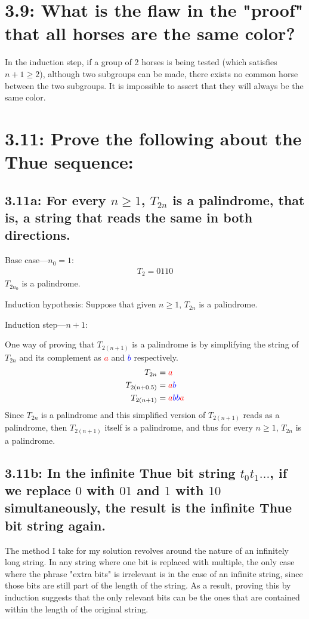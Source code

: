 \documentclass{article}
\begin{document}
\section*{3.9: What is the flaw in the "proof" that all horses are the same color?}
In the induction step, if a group of 2 horses is being tested (which satisfies $n+1\geq2$), although two subgroups can be made, there exists no common horse between the two subgroups. It is impossible to assert that they will always be the same color.
\section*{3.11: Prove the following about the Thue sequence:}
\subsection*{3.11a: For every $n\geq1$, $T_{2n}$ is a palindrome, that is, a string that reads the same in both directions.}
Base case---$n_0=1$:
\begin{align*}
  T_2=0110
\end{align*}
$T_{2n_0}$ is a palindrome.

Induction hypothesis: Suppose that given $n\geq1$, $T_{2n}$ is a palindrome.

Induction step---$n+1$:

One way of proving that $T_{2(n+1)}$ is a palindrome is by simplifying the string of $T_{2n}$ and its complement as \textcolor{red}{$a$} and \textcolor{blue}{$b$} respectively.
\begin{align*}
  T_{2n}&=\textcolor{red}{a}\\
  T_{2(n+0.5)}&=\textcolor{red}{a}\textcolor{blue}{b}\\
  T_{2(n+1)}&=\textcolor{red}{a}\textcolor{blue}{b}\textcolor{blue}{b}\textcolor{red}{a}
\end{align*}
Since $T_{2n}$ is a palindrome and this simplified version of $T_{2(n+1)}$ reads as a palindrome, then $T_{2(n+1)}$ itself is a palindrome, and thus for every $n\geq1$, $T_{2n}$ is a palindrome.
\subsection*{3.11b: In the infinite Thue bit string $t_0t_1\ldots$, if we replace $0$ with $01$ and $1$ with $10$ simultaneously, the result is the infinite Thue bit string again.}
The method I take for my solution revolves around the nature of an infinitely long string. In any string where one bit is replaced with multiple, the only case where the phrase "extra bits" is irrelevant is in the case of an infinite string, since those bits are still part of the length of the string. As a result, proving this by induction suggests that the only relevant bits can be the ones that are contained within the length of the original string.
\end{document}
